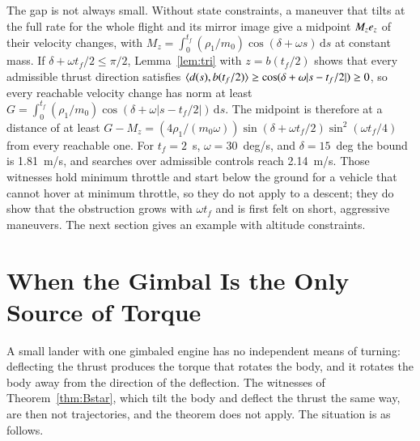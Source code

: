 The gap is not always small. Without state constraints, a maneuver that tilts at the full rate for the whole flight and its
mirror image give a midpoint $M_ze_z$ of their velocity changes, with
$M_z=\int_0^{t_f}(\rho_1/m_0)\cos(\delta+\omega s)\,\mathrm ds$ at constant mass. If $\delta+\omega t_f/2\le\pi/2$,
Lemma~\ref{lem:tri} with $z=b(t_f/2)$ shows that every admissible thrust direction satisfies
$\langle d(s),b(t_f/2)\rangle\ge\cos(\delta+\omega\lvert s-t_f/2\rvert)\ge0$, so every reachable velocity change has norm at least
$G=\int_0^{t_f}(\rho_1/m_0)\cos(\delta+\omega\lvert s-t_f/2\rvert)\,\mathrm ds$. The midpoint is therefore at a distance of at
least $G-M_z=(4\rho_1/(m_0\omega))\sin(\delta+\omega t_f/2)\sin^2(\omega t_f/4)$ from every reachable one. For $t_f=2$~s,
$\omega=30$~deg/s, and $\delta=15$~deg the bound is 1.81~m/s, and searches over admissible controls reach 2.14~m/s. Those
witnesses hold minimum throttle and start below the ground for a vehicle that cannot hover at minimum throttle, so they do
not apply to a descent; they do show that the obstruction grows with $\omega t_f$ and is first felt on short, aggressive
maneuvers. The next section gives an example with altitude constraints.

\section{When the Gimbal Is the Only Source of Torque}\label{sec:tvc}
A small lander with one gimbaled engine has no independent means of turning: deflecting the thrust produces the torque that
rotates the body, and it rotates the body away from the direction of the deflection. The witnesses of
Theorem~\ref{thm:Bstar}, which tilt the body and deflect the thrust the same way, are then not trajectories, and the theorem
does not apply. The situation is as follows.

